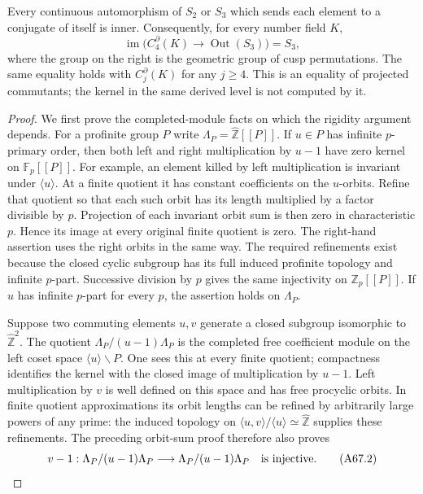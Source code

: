 \begin{proposition}\label{A:third-derived-class-rigidity}
Every continuous automorphism of $S_2$ or $S_3$
which sends each element to a conjugate of itself
is inner. Consequently, for every number field
$K$,
\[
 \operatorname{im}\bigl(
 C_4^\partial(K)\longrightarrow
                  \operatorname{Out}(S_3)\bigr)=S_3,
                                                        \tag{A67.1}
\]
where the group on the right is the geometric
group of cusp permutations. The same equality
holds with $C_j^\partial(K)$ for any $j\geq4$.
This is an equality of projected commutants;
the kernel in the same derived level is not
computed by it.
\end{proposition}
\begin{proof}
We first prove the completed-module facts on
which the rigidity argument depends.
For a profinite group $P$ write
$\Lambda_P=\widehat{\mathbb Z}[[P]]$.
If $u\in P$ has infinite $p$-primary order,
then both left and right multiplication by
$u-1$ have zero kernel on $\mathbb F_p[[P]]$.
For example, an element killed by left
multiplication is invariant under $\langle u\rangle$.
At a finite quotient it has constant
coefficients on the $u$-orbits.
Refine that quotient so that each such orbit
has its length multiplied by a factor divisible
by $p$. Projection of each invariant orbit sum
is then zero in characteristic $p$.
Hence its image at every original finite
quotient is zero. The right-hand assertion
uses the right orbits in the same way.
The required refinements exist because the
closed cyclic subgroup has its full induced
profinite topology and infinite $p$-part.
Successive division by $p$ gives the same
injectivity on $\mathbb Z_p[[P]]$.
If $u$ has infinite $p$-part for every $p$,
the assertion holds on $\Lambda_P$.

Suppose two commuting elements $u,v$ generate
a closed subgroup isomorphic to
$\widehat{\mathbb Z}^2$.
The quotient
$\Lambda_P/(u-1)\Lambda_P$ is the completed
free coefficient module on the left coset
space $\langle u\rangle\backslash P$.
One sees this at every finite quotient;
compactness identifies the kernel with
the closed image of multiplication by $u-1$.
Left multiplication by $v$ is well defined
on this space and has free procyclic orbits.
In finite quotient approximations its orbit
lengths can be refined by arbitrarily large
powers of any prime: the induced topology
on $\langle u,v\rangle/\langle u\rangle
\simeq\widehat{\mathbb Z}$ supplies these
refinements. The preceding orbit-sum proof
therefore also proves
\[
 v-1:\Lambda_P/(u-1)\Lambda_P
       \longrightarrow\Lambda_P/(u-1)\Lambda_P
             \quad\hbox{is injective}.                \tag{A67.2}
\]


\end{proof}
